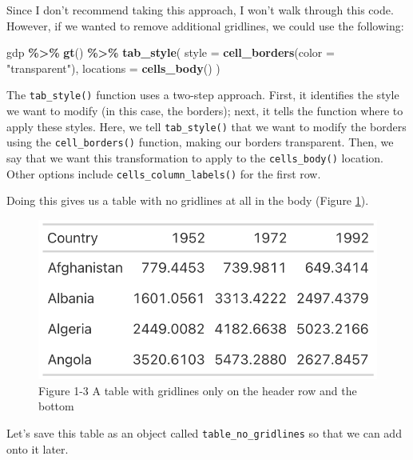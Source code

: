 \documentclass[
]{book}
\newenvironment{Shaded}{\begin{snugshade}}{\end{snugshade}}
\newcommand{\AttributeTok}[1]{\textcolor[rgb]{0.13,0.29,0.53}{#1}}
\newcommand{\FunctionTok}[1]{\textcolor[rgb]{0.13,0.29,0.53}{\textbf{#1}}}
\newcommand{\NormalTok}[1]{#1}
\newcommand{\SpecialCharTok}[1]{\textcolor[rgb]{0.81,0.36,0.00}{\textbf{#1}}}
\newcommand{\StringTok}[1]{\textcolor[rgb]{0.31,0.60,0.02}{#1}}
\begin{document}
Since I don't recommend taking this approach, I won't walk through this code. However, if we wanted to remove additional gridlines, we could use the following:

\begin{Shaded}
\begin{Highlighting}[]
\NormalTok{gdp }\SpecialCharTok{\%\textgreater{}\%}
  \FunctionTok{gt}\NormalTok{() }\SpecialCharTok{\%\textgreater{}\%}
  \FunctionTok{tab\_style}\NormalTok{(}
    \AttributeTok{style =} \FunctionTok{cell\_borders}\NormalTok{(}\AttributeTok{color =} \StringTok{"transparent"}\NormalTok{),}
    \AttributeTok{locations =} \FunctionTok{cells\_body}\NormalTok{()}
\NormalTok{  )}
\end{Highlighting}
\end{Shaded}

The \texttt{tab\_style()} function uses a two-step approach. First, it identifies the style we want to modify (in this case, the borders); next, it tells the function where to apply these styles. Here, we tell \texttt{tab\_style()} that we want to modify the borders using the \texttt{cell\_borders()} function, making our borders transparent. Then, we say that we want this transformation to apply to the \texttt{cells\_body()} location. Other options include \texttt{cells\_column\_labels()} for the first row.

Doing this gives us a table with no gridlines at all in the body (Figure \ref{fig:table-no-body-gridlines}).

\begin{figure}
\includegraphics[width=1\linewidth]{nostarch/temp/F05003} \caption{Figure 1-3   A table with gridlines only on the header row and the bottom}\label{fig:table-no-body-gridlines}
\end{figure}

Let's save this table as an object called \texttt{table\_no\_gridlines} so that we can add onto it later.
\end{document}
